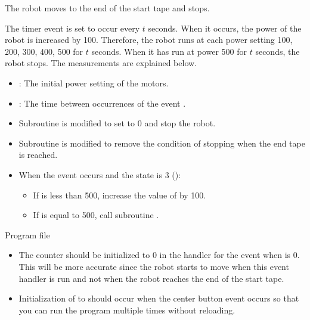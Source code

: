 
The robot moves to the end of the start tape and stops.

The timer event  is set to occur every $t$ seconds. When it
occurs, the power of the robot is increased by 100. Therefore, the robot
runs at each power setting 100, 200, 300, 400, 500 for $t$ seconds. When
it has run at power 500 for $t$ seconds, the robot stops. The
measurements are explained below.


\begin{itemize}
\item {}: The initial power setting of the motors.

\item {}: The time between occurrences of the event .  
\end{itemize}


\begin{itemize}

\item Subroutine  is modified to set
 to 0 and stop the robot.

\item Subroutine  is modified to remove the condition
of stopping when the end tape is reached.

\item When the  event occurs and the state is 3
():
\begin{itemize}
\item If  is less than 500, increase the value of  by 100.
\item If  is equal to 500, call subroutine .
\end{itemize}


\end{itemize}


{\raggedleft \hfill Program file }

\begin{itemize}

\item The counter  should be initialized to 0 in the
handler for the  event when  is 0. This will be more
accurate since the robot starts to move when this event handler is run
and not when the robot reaches the end of the start tape.

\item Initialization of  to  should occur when the
center button event occurs so that you can run the program multiple
times without reloading.

\end{itemize}

